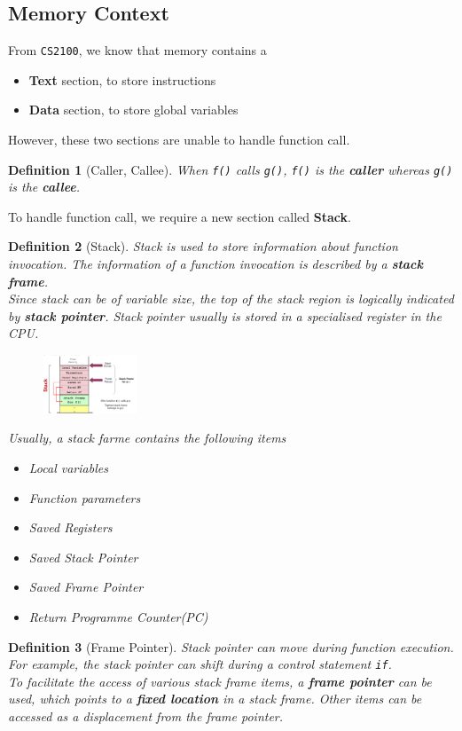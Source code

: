 \documentclass[11pt]{article}
\newtheorem{definition}{Definition}[section]
\theoremstyle{definition}
\begin{document}
\subsection{Memory Context}
From \texttt{CS2100}, we know that memory contains a 
\begin{itemize}[itemsep=0pt]
  \item \textbf{Text} section, to store instructions
  \item \textbf{Data} section, to store global variables
\end{itemize}
However, these two sections are unable to handle function call.
\begin{definition}[Caller, Callee]
\normalfont When \texttt{f()} calls \texttt{g()}, \texttt{f()} is the \textbf{caller} whereas \texttt{g()} is the \textbf{callee}.
\end{definition}
To handle function call, we require a new section called \textbf{Stack}.
\begin{definition}[Stack]
\normalfont Stack is used to store information about function invocation. The information of a function invocation is described by a \textbf{stack frame}.\\
Since stack can be of variable size, the top of the stack region is logically indicated by \textbf{stack pointer}. Stack pointer usually is stored in a specialised register in the CPU.
\begin{figure}[h]
\centering
\includegraphics[width=0.25\textwidth]{2_1.png}
\end{figure}
Usually, a stack farme contains the following items
\begin{itemize}[itemsep=0pt]
  \item Local variables
  \item Function parameters
  \item Saved Registers
  \item Saved Stack Pointer
  \item Saved Frame Pointer
  \item Return Programme Counter(PC)
\end{itemize}
\end{definition}
\begin{definition}[Frame Pointer]
\normalfont Stack pointer can move during function execution. For example, the stack pointer can shift during a control statement \texttt{if}.\\
To facilitate the access of various stack frame items, a \textbf{frame pointer} can be used, which points to a \textbf{fixed location} in a stack frame. Other items can be accessed as a displacement from the frame pointer.
\end{definition}
\end{document}
